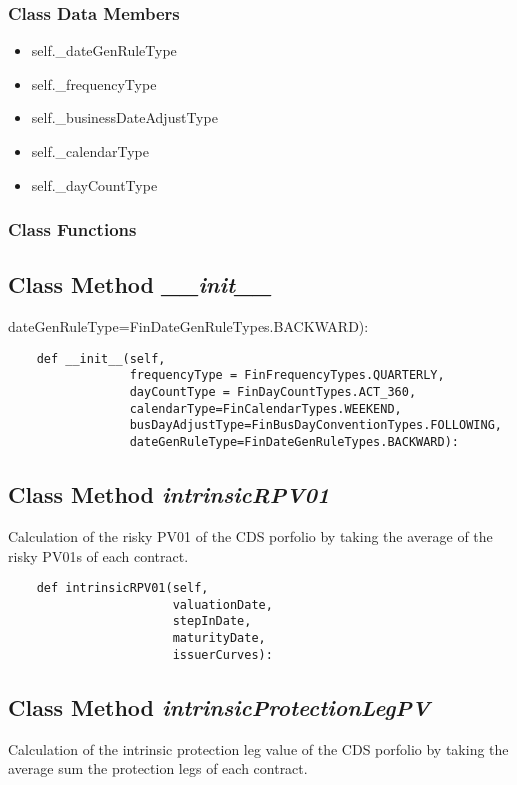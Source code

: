 \documentclass[twoside,11pt]{book}
\begin{document}
\subsubsection{Class Data Members}
\begin{itemize}
\item{self.\_dateGenRuleType}
\item{self.\_frequencyType}
\item{self.\_businessDateAdjustType}
\item{self.\_calendarType}
\item{self.\_dayCountType}
\end{itemize}

\subsubsection{Class Functions}

\subsection{Class Method {\it \_\_init\_\_}}
dateGenRuleType=FinDateGenRuleTypes.BACKWARD):

\begin{lstlisting}
    def __init__(self,
                 frequencyType = FinFrequencyTypes.QUARTERLY,
                 dayCountType = FinDayCountTypes.ACT_360,
                 calendarType=FinCalendarTypes.WEEKEND,
                 busDayAdjustType=FinBusDayConventionTypes.FOLLOWING,
                 dateGenRuleType=FinDateGenRuleTypes.BACKWARD):
\end{lstlisting}

\subsection{Class Method {\it intrinsicRPV01}}
Calculation of the risky PV01 of the CDS porfolio by taking the average of the risky PV01s of each contract. 

\begin{lstlisting}
    def intrinsicRPV01(self,
                       valuationDate,
                       stepInDate,
                       maturityDate,
                       issuerCurves):
\end{lstlisting}

\subsection{Class Method {\it intrinsicProtectionLegPV}}
Calculation of the intrinsic protection leg value of the CDS porfolio by taking the average sum the protection legs of each contract. 
\end{document}
